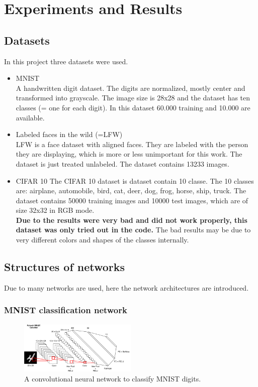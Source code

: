 \documentclass[
     11pt,         %
     a4paper,      %
     oneside,
     ]{article}
\begin{document}
\section{Experiments and Results}
\subsection{Datasets}
In this project three datasets were used.
\begin{itemize}
  \item MNIST \\
  A handwritten digit dataset. The digits are normalized, mostly center and transformed into grayscale.
  The image size is 28x28 and the dataset has ten classes (= one for each digit). In this dataset 60.000 training and 10.000 are available. \cite{MNIST}
  \item Labeled faces in the wild (=LFW)\\
  LFW is a face dataset with aligned faces. They are labeled with the person they are displaying, which is more or less unimportant for this work. The dataset is just treated unlabeled. The dataset contains 13233 images.\cite{LFW1}\cite{LFW2}\cite{LFW3}\cite{LFW4}
  \item CIFAR 10
  The CIFAR 10 dataset is dataset contain 10 classe. The 10 classes are: airplane, automobile, bird, cat, deer, dog, frog, horse, ship, truck. The dataset contains 50000 training images and 10000 test images, which are of size 32x32 in RGB mode. \\
  \textbf{Due to the results were very bad and did not work properly, this dataset was only tried out in the code.} The bad results may be due to very different colors and shapes of the classes internally.\cite{CIFAR10}
\end{itemize}

\subsection{Structures of networks}
Due to many networks are used, here the network architectures are introduced.
\subsubsection{MNIST classification network}
\begin{figure}[H]
  \begin{center}
    \includegraphics[width=0.5\textwidth]{images/mnist_convet.png}
    \caption{A convolutional neural network to classify MNIST digits.\cite{MNISTclassify}}
  \end{center}
\end{figure}
\end{document}
